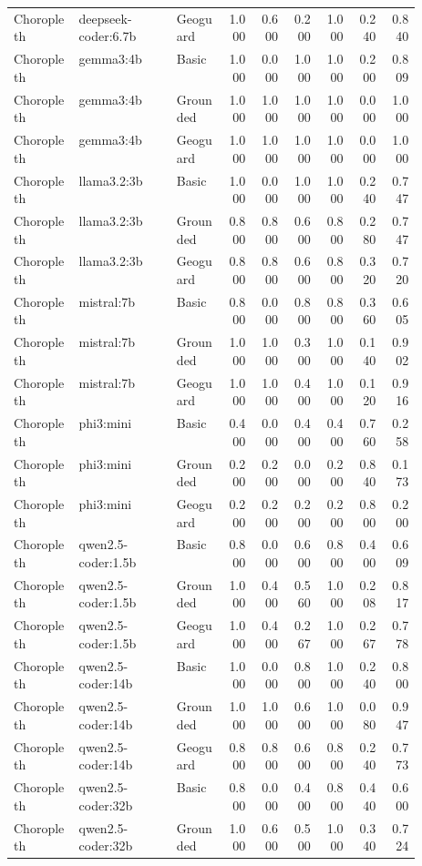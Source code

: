 \begin{longtable}{p{0.16\linewidth}p{0.24\linewidth}p{0.12\linewidth}rrrrrr}
Choropleth & deepseek-coder:6.7b & Geoguard & 1.000 & 0.600 & 0.200 & 1.000 & 0.240 & 0.840 \\
Choropleth & gemma3:4b & Basic & 1.000 & 0.000 & 1.000 & 1.000 & 0.200 & 0.809 \\
Choropleth & gemma3:4b & Grounded & 1.000 & 1.000 & 1.000 & 1.000 & 0.000 & 1.000 \\
Choropleth & gemma3:4b & Geoguard & 1.000 & 1.000 & 1.000 & 1.000 & 0.000 & 1.000 \\
Choropleth & llama3.2:3b & Basic & 1.000 & 0.000 & 1.000 & 1.000 & 0.240 & 0.747 \\
Choropleth & llama3.2:3b & Grounded & 0.800 & 0.800 & 0.600 & 0.800 & 0.280 & 0.747 \\
Choropleth & llama3.2:3b & Geoguard & 0.800 & 0.800 & 0.600 & 0.800 & 0.320 & 0.720 \\
Choropleth & mistral:7b & Basic & 0.800 & 0.000 & 0.800 & 0.800 & 0.360 & 0.605 \\
Choropleth & mistral:7b & Grounded & 1.000 & 1.000 & 0.300 & 1.000 & 0.140 & 0.902 \\
Choropleth & mistral:7b & Geoguard & 1.000 & 1.000 & 0.400 & 1.000 & 0.120 & 0.916 \\
Choropleth & phi3:mini & Basic & 0.400 & 0.000 & 0.400 & 0.400 & 0.760 & 0.258 \\
Choropleth & phi3:mini & Grounded & 0.200 & 0.200 & 0.000 & 0.200 & 0.840 & 0.173 \\
Choropleth & phi3:mini & Geoguard & 0.200 & 0.200 & 0.200 & 0.200 & 0.800 & 0.200 \\
Choropleth & qwen2.5-coder:1.5b & Basic & 0.800 & 0.000 & 0.600 & 0.800 & 0.400 & 0.609 \\
Choropleth & qwen2.5-coder:1.5b & Grounded & 1.000 & 0.400 & 0.560 & 1.000 & 0.208 & 0.817 \\
Choropleth & qwen2.5-coder:1.5b & Geoguard & 1.000 & 0.400 & 0.267 & 1.000 & 0.267 & 0.778 \\
Choropleth & qwen2.5-coder:14b & Basic & 1.000 & 0.000 & 0.800 & 1.000 & 0.240 & 0.800 \\
Choropleth & qwen2.5-coder:14b & Grounded & 1.000 & 1.000 & 0.600 & 1.000 & 0.080 & 0.947 \\
Choropleth & qwen2.5-coder:14b & Geoguard & 0.800 & 0.800 & 0.600 & 0.800 & 0.240 & 0.773 \\
Choropleth & qwen2.5-coder:32b & Basic & 0.800 & 0.000 & 0.400 & 0.800 & 0.440 & 0.600 \\
Choropleth & qwen2.5-coder:32b & Grounded & 1.000 & 0.600 & 0.500 & 1.000 & 0.340 & 0.724 \\

\end{longtable}
